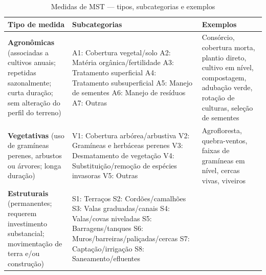 \begin{table}[htbp]
\centering\small
\caption{Medidas de MST --- tipos, subcategorias e exemplos}
\label{tab:app_slm_measures}
\begin{tabular}{p{3cm}p{4cm}p{7cm}}
\toprule
\textbf{Tipo de medida} & \textbf{Subcategorias} & \textbf{Exemplos} \\
\midrule
\textbf{Agronômicas} \newline
(associadas a cultivos anuais; repetidas sazonalmente; curta duração; sem alteração do perfil do terreno) &
  A1: Cobertura vegetal/solo \newline
  A2: Matéria orgânica/fertilidade \newline
  A3: Tratamento superficial \newline
  A4: Tratamento subsuperficial \newline
  A5: Manejo de sementes \newline
  A6: Manejo de resíduos \newline
  A7: Outras &
  Consórcio, cobertura morta, plantio direto, cultivo em nível, compostagem, adubação verde, rotação de culturas, seleção de sementes \\
\addlinespace
\textbf{Vegetativas} \newline
(uso de gramíneas perenes, arbustos ou árvores; longa duração) &
  V1: Cobertura arbórea/arbustiva \newline
  V2: Gramíneas e herbáceas perenes \newline
  V3: Desmatamento de vegetação \newline
  V4: Substituição/remoção de espécies invasoras \newline
  V5: Outras &
  Agrofloresta, quebra-ventos, faixas de gramíneas em nível, cercas vivas, viveiros \\
\addlinespace
\textbf{Estruturais} \newline
(permanentes; requerem investimento substancial; movimentação de terra e/ou construção) &
  S1: Terraços \newline
  S2: Cordões/camalhões \newline
  S3: Valas graduadas/canais \newline
  S4: Valas/covas niveladas \newline
  S5: Barragens/tanques \newline
  S6: Muros/barreiras/paliçadas/cercas \newline
  S7: Captação/irrigação \newline
  S8: Saneamento/efluentes \newline

\end{tabular}
\end{table}
